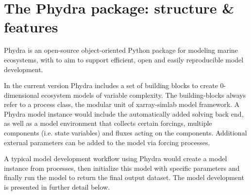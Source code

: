 \documentclass[template.tex]{subfiles}
\begin{document}

\section{The Phydra package: structure \& features} \label{Section:phydrapackage}

Phydra is an open-source object-oriented Python package for modeling marine ecosystems, with to aim to support efficient, open and easily reproducible model development. 

In the current version Phydra includes a set of building blocks to create 0-dimensional ecosystem models of variable complexity. The building-blocks always refer to a process class, the modular unit of xarray-simlab model framework. A Phydra model instance would include the automatically added solving back end, as well as a model environment that collects certain forcings, multiple components (i.e. state variables) and fluxes acting on the components. Additional external parameters can be added to the model via forcing processes.

A typical model development workflow using Phydra would create a model instance from processes, then initialize this model with specific parameters and finally run the model to return the final output dataset. The model development is presented in further detail below.
\end{document}
